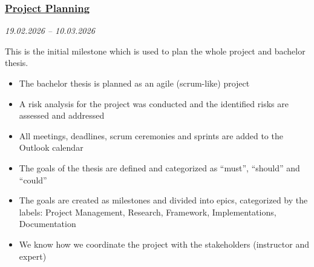 \subsubsection{\href{https://gitlab.ti.bfh.ch/groups/gausf1-vonal3/-/milestones/1}{Project Planning}}\label{subsubsec:milestone-project-planning}
\textit{19.02.2026 -- 10.03.2026}

This is the initial milestone which is used to plan the whole project and bachelor thesis.

\begin{itemize}
    \item[$\checkmark$] The bachelor thesis is planned as an agile (scrum-like) project
    \item[$\checkmark$] A risk analysis for the project was conducted and the identified risks are assessed and addressed
    \item[$\checkmark$] All meetings, deadlines, scrum ceremonies and sprints are added to the Outlook calendar
    \item[$\checkmark$] The goals of the thesis are defined and categorized as \enquote{must}, \enquote{should} and \enquote{could}
    \item[$\checkmark$] The goals are created as milestones and divided into epics, categorized by the labels: Project Management, Research, Framework, Implementations, Documentation
    \item[$\checkmark$] We know how we coordinate the project with the stakeholders (instructor and expert)
\end{itemize}
